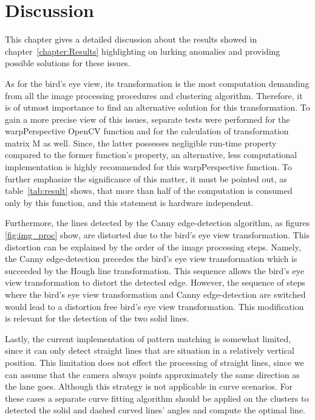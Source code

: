 \documentclass[Report.tex]{subfiles}
\begin{document}
\chapter{Discussion}
\label{chapter:Discussion}

This chapter gives a detailed discussion about the results showed in
chapter~\ref{chapter:Results} highlighting on lurking anomalies and providing
possible solutions for these issues.

As for the bird's eye view, its transformation is the most computation
demanding from all the image processing procedures and clustering algorithm.
Therefore, it is of utmost importance to find an alternative solution for this
transformation. To gain a more precise view of this issues, separate tests were
performed for the warpPerspective OpenCV function and for the calculation of
transformation matrix M as well. Since, the latter possesses negligible run-time
property compared to the former function's property, an alternative, less
computational implementation is highly recommended for this warpPerspective
function. To further emphasize the significance of this matter, it must be
pointed out, as table~\ref{tab:result} shows, that more than half of the
computation is consumed only by this function, and this statement is hardware
independent.

Furthermore, the lines detected by the Canny edge-detection algorithm, as
figures \ref{fig:img_proc} show, are distorted due to the bird's eye view
transformation. This distortion can be explained by the order of the image
processing steps. Namely, the Canny edge-detection precedes the bird's eye view
transformation which is succeeded by the Hough line transformation. This
sequence allows the bird's eye view transformation to distort the detected
edge. However, the sequence of steps where the bird's eye view transformation
and Canny edge-detection are switched would lead to a distortion free bird's
eye view transformation. This modification is relevant for the detection of the
two solid lines.

Lastly, the current implementation of pattern matching is somewhat limited,
since it can only detect straight lines that are situation in a relatively
vertical position. This limitation does not effect the processing of straight
lines, since we can assume that the camera always points approximately the same
direction as the lane goes. Although this strategy is not applicable in curve
scenarios. For these cases a separate curve fitting algorithm should be applied
on the clusters to detected the solid and dashed curved lines' angles and
compute the optimal line.
\end{document}
